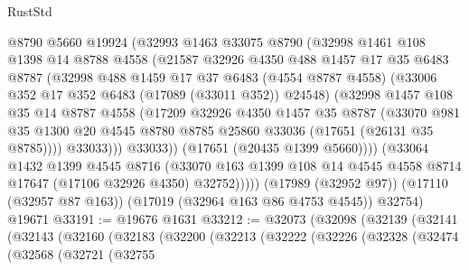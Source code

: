 \begin{lexlean}{RustStd}
\begin{coremodule}
                @8790
                @5660
                @19924
                (@32993
                  @1463
                  @33075
                  @8790
                  (@32998
                    @1461
                    @108
                    @1398
                    @14
                    @8788
                    @4558
                    (@21587
                      @32926
                      @4350
                      @488
                      @1457
                      @17
                      @35
                      @6483
                      @8787
                      (@32998
                        @488
                        @1459
                        @17
                        @37
                        @6483
                        (@4554 @8787 @4558)
                        (@33006 @352 @17 @352 @6483 (@17089 (@33011 @352)) @24548)
                        (@32998
                          @1457
                          @108
                          @35
                          @14
                          @8787
                          @4558
                          (@17209
                            @32926
                            @4350
                            @1457
                            @35
                            @8787
                            (@33070
                              @981
                              @35
                              @1300
                              @20
                              @4545
                              @8780
                              @8785
                              @25860
                              @33036
                              (@17651 (@26131 @35 @8785))))
                          @33033)))
                    @33033))
                (@17651 (@20435 @1399 @5660))))
            (@33064
              @1432
              @1399
              @4545
              @8716
              (@33070 @163 @1399 @108 @14 @4545 @4558 @8714 @17647 (@17106 @32926 @4350) @32752)))))
      (@17989 (@32952 @97))
      (@17110 (@32957 @87 @163))
      (@17019 (@32964 @163 @86 @4753 @4545))
      @32754)
    @19671
@33191 := @19676 @1631
@33212 := @32073
    (@32098
      (@32139
        (@32141
          (@32143
            (@32160
              (@32183
                (@32200
                  (@32213
                    (@32222
                      (@32226
                        (@32328
                          (@32474
                            (@32568
                              (@32721
                                (@32755

\end{coremodule}
\end{lexlean}
